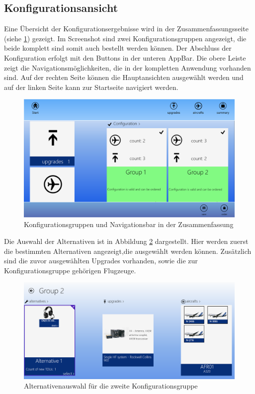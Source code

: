 \subsection{Konfigurationsansicht}
Eine Übersicht der Konfigurationsergebnisse wird in der Zusammenfassungsseite (siehe \ref{configurationResultImpl}) gezeigt. Im Screenshot sind zwei Konfigurationsgruppen angezeigt, die beide komplett sind somit auch bestellt werden können. Der Abschluss der Konfiguration erfolgt mit den Buttons in der unteren AppBar. Die obere Leiste zeigt die Navigationsmöglichkeiten, die in der kompletten Anwendung vorhanden sind. Auf der rechten Seite können die Hauptansichten ausgewählt werden und auf der linken Seite kann zur Startseite navigiert werden. 
\begin{figure}[H]
\centering
\includegraphics[width=\hsize]{images/impl/app_bar_impl}
\caption{Konfigurationsgruppen und Navigationsbar in der Zusammenfassung}
\label{configurationResultImpl}
\end{figure}
Die Auswahl der Alternativen ist in Abbildung \ref{alternativeSelectionImpl} dargestellt. Hier werden zuerst die bestimmten Alternativen angezeigt,die ausgewählt werden können. Zusätzlich sind die zuvor ausgewählten Upgrades vorhanden, sowie die zur Konfigurationsgruppe gehörigen Flugzeuge. 
\begin{figure}[H]
\centering
\includegraphics[width=\hsize]{images/impl/alternative_impl}
\caption{Alternativenauswahl für die zweite Konfigurationsgruppe}
\label{alternativeSelectionImpl}
\end{figure}

 